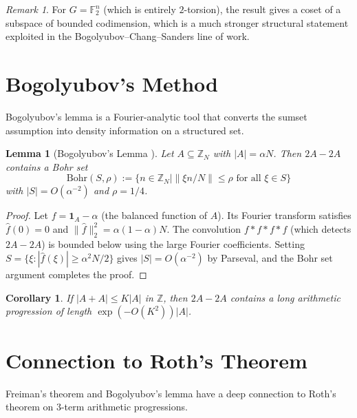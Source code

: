 \documentclass[12pt,a4paper]{amsart}
\newtheorem{lemma}[theorem]{Lemma}
\newtheorem{corollary}[theorem]{Corollary}
\theoremstyle{definition}
\theoremstyle{remark}
\newtheorem{remark}[theorem]{Remark}
\newcommand{\F}{\mathbb{F}}
\newcommand{\Z}{\mathbb{Z}}
\begin{document}
\begin{remark}
For $G = \F_2^n$ (which is entirely $2$-torsion), the result gives a coset of a
subspace of bounded codimension, which is a much stronger structural statement
exploited in the Bogolyubov--Chang--Sanders line of work.
\end{remark}

\section{Bogolyubov's Method}\label{sec:bogolyubov}

Bogolyubov's lemma is a Fourier-analytic tool that converts the sumset assumption
into density information on a structured set.

\begin{lemma}[Bogolyubov's Lemma \cite{Bogolyubov1939}]\label{lem:bogolyubov}
Let $A \subseteq \Z_N$ with $|A| = \alpha N$. Then $2A - 2A$ contains a Bohr set
\[
  \mathrm{Bohr}(S, \rho) := \{n \in \Z_N \mid \|\xi n / N\| \leq \rho \text{ for all } \xi \in S\}
\]
with $|S| = O(\alpha^{-2})$ and $\rho = 1/4$.
\end{lemma}

\begin{proof}
Let $f = \mathbf{1}_A - \alpha$ (the balanced function of $A$). Its Fourier
transform satisfies $\hat{f}(0) = 0$ and $\|\hat{f}\|_2^2 = \alpha(1-\alpha)N$.
The convolution $f * f * f * f$ (which detects $2A - 2A$) is bounded below using
the large Fourier coefficients. Setting $S = \{\xi : |\hat{f}(\xi)| \geq \alpha^2 N / 2\}$
gives $|S| = O(\alpha^{-2})$ by Parseval, and the Bohr set argument completes
the proof.
\end{proof}

\begin{corollary}
If $|A + A| \leq K|A|$ in $\Z$, then $2A - 2A$ contains a long arithmetic
progression of length $\exp(-O(K^2)) |A|$.
\end{corollary}

\section{Connection to Roth's Theorem}\label{sec:roth}

Freiman's theorem and Bogolyubov's lemma have a deep connection to Roth's theorem
on 3-term arithmetic progressions.
\end{document}
